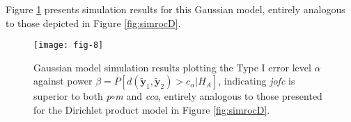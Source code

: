 \documentclass[12pt,xcolor]{article}
\newcommand{\1}{\ensuremath{\mbox{{\bf 1}}}}
\begin{document}
Figure \ref{fig:simrocG} presents simulation results for this Gaussian model,
entirely analogous to those depicted in Figure \ref{fig:simrocD}.

\begin{comment}
\subsubsection{Sancar's}

For each replicate of the simulation, $mc=1,\ldots N$

A positive-definite matrix $\Sigma$ is randomly generated for the
covariance matrix. $r$ (the parameter that controls the matchedness
of the pairs) is the largest eigenvalue of this matrix, the rest of
the eigenvalues are generated from uniform distribution $Unif\left(0,r\right)$
\[
\Sigma:\sigma_{1,\ldots p-1}\left(\Sigma\right)\sim Unif\left(0,r\right);\sigma_{p}\left(\Sigma\right)=r\]


$T=M+2L$ topic/common means are randomly generated from $\mathcal{N}\left(\vec{0},\Sigma\right)$
distribution

\[
\mu_{t}\sim\mathcal{N}\left(\vec{0},\Sigma\right);t=1,\ldots T\]


$K=2$ matched points are generated from

\[
a_{ti}\sim\mathcal{N}\left(\mu_{t},I_{p}\right);t=1,\ldots T;i=1,\ldots K\]


As $r$ increases, the degree of matchedness increases since the covariance
matrix for $a_{ti}$ is always identity matrix,$I_{p}$,while the
max. eigenvalue of $\Sigma$ increases

For spurious correlation phenomenon, $q$-dimensional vector is generated(where
$q=p$. This was the most obvious(to me) way of generating the covariance
matrix for the noise dimension).

\[
b_{ti}\sim\mathcal{N}\left(\vec{0},I_{p}+\Sigma\right);t=1,\ldots T;i=1,\ldots K\]


Then, feature vectors are $x_{ti}=\left[a_{ti}\: b_{ti}\right]\in\mathbb{R}^{p+q}$

The first $M$ matched K-tuples(pairs when $K=2$) are the training
set,$x_{it}$;$t=M+1,\ldots,M+L$ pairs are the matched test set,
and $x_{ti},\{t=M+1,\ldots,M+L;i=1\}\cup\{t=M+L+1,\ldots,M+2L;i=2\}$
are the unmatched data set.
\end{comment}

\begin{figure}[h]
\begin{center}
\texttt{[image: fig-8]}
\caption{
Gaussian model
simulation results
plotting the Type I error level $\alpha$ against power $\beta = P[d(\widetilde{\bm{y}}_1,\widetilde{\bm{y}}_2)>c_{\alpha} | H_A]$,
indicating {\em jofc} is superior to both {\it p}$\circ${\it m} and {\em cca},
entirely analogous to those presented for the Dirichlet product model in Figure \ref{fig:simrocD}.
}\label{fig:simrocG}
\end{center}
\end{figure}
\end{document}
